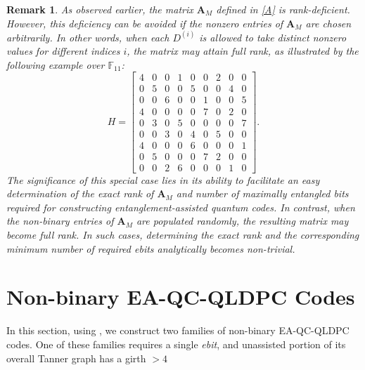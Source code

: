 \documentclass[conference]{IEEEtran}
\newtheorem{remark}{Remark}
\begin{document}
\begin{remark}\label{remark.2}
   As observed earlier, the matrix $\mathbf{A}_{M}$ defined in \eqref{A} is rank-deficient. However, this deficiency can be avoided if the nonzero entries of $\mathbf{A}_{M}$ are chosen arbitrarily. In other words, when each $D^{(i)}$ is allowed to take distinct nonzero values for different indices $i$, the matrix may attain full rank, as illustrated by the following example over $\mathbb{F}_{11}$:
\begin{equation*}
H =
\begin{bmatrix}
4 & 0 & 0 & 1 & 0 & 0 & 2 & 0 & 0 \\
0 & 5 & 0 & 0 & 5 & 0 & 0 & 4 & 0 \\
0 & 0 & 6 & 0 & 0 & 1 & 0 & 0 & 5 \\
4 & 0 & 0 & 0 & 0 & 7 & 0 & 2 & 0 \\
0 & 3 & 0 & 5 & 0 & 0 & 0 & 0 & 7 \\
0 & 0 & 3 & 0 & 4 & 0 & 5 & 0 & 0 \\
4 & 0 & 0 & 0 & 6 & 0 & 0 & 0 & 1 \\
0 & 5 & 0 & 0 & 0 & 7 & 2 & 0 & 0 \\
0 & 0 & 2 & 6 & 0 & 0 & 0 & 1 & 0
\end{bmatrix}.
\end{equation*}
The significance of this special case lies in its ability to facilitate an easy determination of the exact rank of $\mathbf{A}_{M}$ and number of maximally entangled bits required for constructing entanglement-assisted quantum codes. In contrast, when the non-binary entries of $\mathbf{A}_{M}$ are populated randomly, the resulting matrix may become full rank. In such cases, determining the exact rank and the corresponding minimum number of required ebits analytically becomes non-trivial.
\end{remark}
\section{Non-binary EA-QC-QLDPC Codes}\label{Sec.3}
In this section, using \cite[Theorem 4]{galindo2019entanglement}, we construct two families of non-binary EA-QC-QLDPC codes. One of these families requires a single \textit{ebit}, and unassisted portion of its overall Tanner graph has a girth $>4$ 
\end{document}
